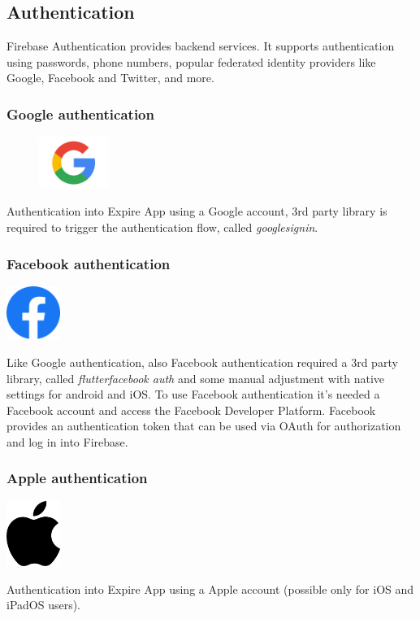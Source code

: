 \subsection{Authentication}
Firebase Authentication provides backend services. It supports authentication using passwords, phone numbers, popular federated identity providers like Google, Facebook and Twitter, and more.

\subsubsection{Google authentication}
\begin{figure}
\vspace{-0.8cm}
\includegraphics[width=0.20\textwidth]{Images/external_serv/g.png}
\end{figure}
Authentication into Expire App using a Google account, 3rd party library is required to trigger the authentication flow, called \textit{google\textunderscore sign\textunderscore in}.
\newpage

\subsubsection{Facebook authentication}
\begin{center}
\includegraphics[width=0.13\textwidth]{Images/external_serv/f.png}
\end{center}
Like Google authentication, also Facebook authentication required a 3rd party library, called \textit{flutter\textunderscore facebook \textunderscore auth} and some manual adjustment with native settings for android and iOS. To use Facebook authentication it's needed a Facebook account and access the Facebook Developer Platform. Facebook provides an authentication token that can be used via OAuth for authorization and log in into Firebase.\newline

\subsubsection{Apple authentication}
\begin{center}
\includegraphics[width=0.13\textwidth]{Images/external_serv/a.png}
\end{center}
Authentication into Expire App using a Apple account (possible only for iOS and iPadOS users).\newline

